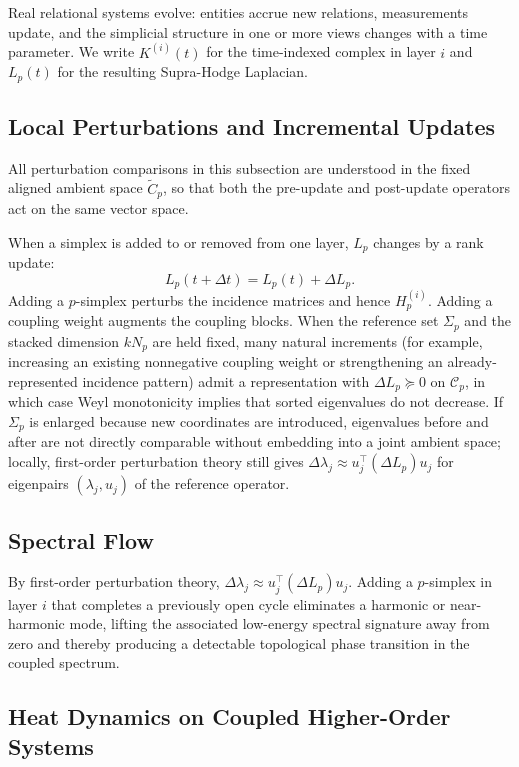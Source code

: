 \documentclass[11pt]{article}
\theoremstyle{definition}
\theoremstyle{remark}
\newcommand{\Ctil}{\widetilde{C}}
\newcommand{\calC}{\mathcal{C}}
\begin{document}
Real relational systems evolve: entities accrue new relations, measurements update,
and the simplicial structure in one or more views changes with a time parameter.
We write $K^{(i)}(t)$ for the time-indexed complex in layer $i$ and $L_p(t)$ for
the resulting Supra-Hodge Laplacian.

\subsection{Local Perturbations and Incremental Updates}

All perturbation comparisons in this subsection are understood in the fixed
aligned ambient space $\Ctil_p$, so that both the pre-update and post-update
operators act on the same vector space.

When a simplex is added to or removed from one layer, $L_p$ changes by a rank
update:
\[
  L_p(t+\Delta t) = L_p(t) + \Delta L_p.
\]
Adding a $p$-simplex perturbs the incidence matrices and hence $H_p^{(i)}$. Adding
a coupling weight augments the coupling blocks. When the reference set $\Sigma_p$
and the stacked dimension $kN_p$ are held fixed, many natural increments (for
example, increasing an existing nonnegative coupling weight or strengthening an
already-represented incidence pattern) admit a representation with
$\Delta L_p\succeq 0$ on $\calC_p$, in which case Weyl monotonicity implies that
sorted eigenvalues do not decrease. If $\Sigma_p$ is enlarged because new
coordinates are introduced, eigenvalues before and after are not directly
comparable without embedding into a joint ambient space; locally, first-order
perturbation theory still gives $\Delta\lambda_j \approx u_j^\top(\Delta L_p)u_j$
for eigenpairs $(\lambda_j,u_j)$ of the reference operator.

\subsection{Spectral Flow}

By first-order perturbation theory, $\Delta\lambda_j \approx u_j^\top(\Delta L_p)u_j$.
Adding a $p$-simplex in layer $i$ that completes a previously open cycle eliminates a harmonic or near-harmonic mode, lifting the associated low-energy spectral signature away from zero and thereby producing a detectable topological phase transition in the coupled spectrum.

\subsection{Heat Dynamics on Coupled Higher-Order Systems}
\end{document}
